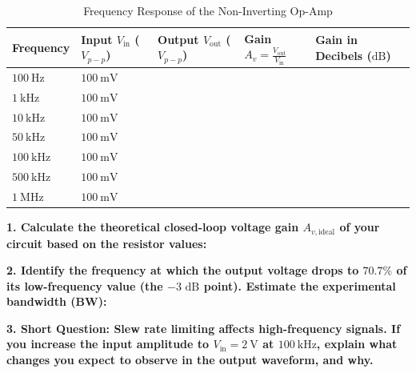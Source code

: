 \begin{table}[h!]
\centering
\sffamily
\renewcommand{\arraystretch}{1.4}
\begin{tabularx}{\textwidth}{|Y|Y|Y|Y|Y|}
    \hline
    \textbf{Frequency} & \textbf{Input $V_{\text{in}}$ ($V_{p-p}$)} & \textbf{Output $V_{\text{out}}$ ($V_{p-p}$)} & \textbf{Gain $A_v = \frac{V_{\text{out}}}{V_{\text{in}}}$} & \textbf{Gain in Decibels ($\text{dB}$)} \\
    \hline
    $\SI{100}{\hertz}$ & $\SI{100}{\milli\volt}$ & & & \\
    \hline
    $\SI{1}{\kilo\hertz}$ & $\SI{100}{\milli\volt}$ & & & \\
    \hline
    $\SI{10}{\kilo\hertz}$ & $\SI{100}{\milli\volt}$ & & & \\
    \hline
    $\SI{50}{\kilo\hertz}$ & $\SI{100}{\milli\volt}$ & & & \\
    \hline
    $\SI{100}{\kilo\hertz}$ & $\SI{100}{\milli\volt}$ & & & \\
    \hline
    $\SI{500}{\kilo\hertz}$ & $\SI{100}{\milli\volt}$ & & & \\
    \hline
    $\SI{1}{\mega\hertz}$ & $\SI{100}{\milli\volt}$ & & & \\
    \hline
\end{tabularx}
\caption{Frequency Response of the Non-Inverting Op-Amp}
\label{tab:freq_response}
\end{table}

\noindent
\textbf{1. Calculate the theoretical closed-loop voltage gain $A_{v,\text{ideal}}$ of your circuit based on the resistor values:}

\noindent
\textbf{2. Identify the frequency at which the output voltage drops to $70.7\%$ of its low-frequency value (the $-3\text{ dB}$ point). Estimate the experimental bandwidth (BW):}

\noindent
\textbf{3. Short Question: Slew rate limiting affects high-frequency signals. If you increase the input amplitude to $V_{\text{in}} = \SI{2}{\volt}$ at $\SI{100}{\kilo\hertz}$, explain what changes you expect to observe in the output waveform, and why.}
